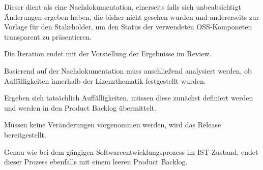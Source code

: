 Dieser dient als eine Nachdokumentation, einerseits falls sich unbeabsichtigt Änderungen ergeben haben, die bisher nicht gesehen wurden und andererseits zur Vorlage für den Stakeholder, um den Status der verwendeten OSS-Komponeten transparent zu präsentieren. 

Die Iteration endet mit der Vorstellung der Ergebnisse im Review. 

Basierend auf der Nachdokumentation muss anschließend analysiert werden, ob Auffälligkeiten innerhalb der Lizenzthematik festgestellt wurden.  

Ergeben sich tatsächlich Auffälligkeiten, müssen diese zunächst definiert werden und werden in den Product Backlog übermittelt. 

Müssen keine Veränderungen vorgenommen werden, wird das Release bereitgestellt. 

Genau wie bei dem gängigen Softwareentwicklungsprozess im IST-Zustand, endet dieser Prozess ebenfalls mit einem leeren Product Backlog.  

















